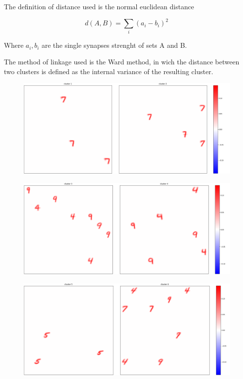\documentclass[a4paper]{report}
\begin{document}
The definition of distance used is the normal euclidean distance

\begin{equation}
    d(A,B) = \sum_i (a_i - b_i)^2
\end{equation}

Where $a_i, b_i$ are the single synapses strenght of sets A and B.

The method of linkage used is the Ward method, in wich the distance between two clusters is defined as the internal variance of the resulting cluster.

\begin{figure} [H]
    \centering
    \includegraphics [width=\textwidth ] {c/e/1.png}
    \caption{}
\end{figure}

\begin{figure} [H]
    \centering
    \includegraphics [width=\textwidth ] {c/e/3.png}
    \caption{}
\end{figure}

\begin{figure} [H]
    \centering
    \includegraphics [width=\textwidth ] {c/e/5.png}
    \caption{}
\end{figure}
\end{document}
